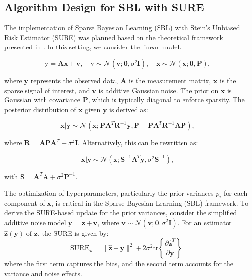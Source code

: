 \documentclass{article}
\begin{document}
\subsection{Algorithm Design for SBL with SURE}
The implementation of Sparse Bayesian Learning (SBL) with Stein's Unbiased Risk Estimator (SURE) was planned based on the theoretical framework presented in \citet{slockSURE}. In this setting, we consider the linear model:

\begin{equation}
    \mathbf{y} = \mathbf{A}\mathbf{x} + \mathbf{v}, \quad \mathbf{v} \sim \mathcal{N}(\mathbf{v}; \mathbf{0}, \sigma^2 \mathbf{I}), \quad \mathbf{x} \sim \mathcal{N}(\mathbf{x}; \mathbf{0}, \mathbf{P}),
\end{equation}

where $\mathbf{y}$ represents the observed data, $\mathbf{A}$ is the measurement matrix, $\mathbf{x}$ is the sparse signal of interest, and $\mathbf{v}$ is additive Gaussian noise. The prior on $\mathbf{x}$ is Gaussian with covariance $\mathbf{P}$, which is typically diagonal to enforce sparsity. The posterior distribution of $\mathbf{x}$ given $\mathbf{y}$ is derived as:

\begin{equation}
    \mathbf{x}|\mathbf{y} \sim \mathcal{N}\left(\mathbf{x}; \mathbf{P}\mathbf{A}^T\mathbf{R}^{-1}\mathbf{y}, \mathbf{P} - \mathbf{P}\mathbf{A}^T\mathbf{R}^{-1}\mathbf{A}\mathbf{P}\right),
\end{equation}

where $\mathbf{R} = \mathbf{A}\mathbf{P}\mathbf{A}^T + \sigma^2 \mathbf{I}$. Alternatively, this can be rewritten as:

\begin{equation}
    \mathbf{x}|\mathbf{y} \sim \mathcal{N}\left(\mathbf{x}; \mathbf{S}^{-1}\mathbf{A}^T\mathbf{y}, \sigma^2 \mathbf{S}^{-1}\right),
\end{equation}

with $\mathbf{S} = \mathbf{A}^T\mathbf{A} + \sigma^2 \mathbf{P}^{-1}$. 

The optimization of hyperparameters, particularly the prior variances \( p_i \) for each component of \(\mathbf{x}\), is critical in the Sparse Bayesian Learning (SBL) framework.  To derive the SURE-based update for the prior variances, consider the simplified additive noise model \(\mathbf{y} = \mathbf{z} + \mathbf{v}\), where \(\mathbf{v} \sim \mathcal{N}(\mathbf{v}; \mathbf{0}, \sigma^2 \mathbf{I})\). For an estimator \(\hat{\mathbf{z}}(\mathbf{y})\) of \(\mathbf{z}\), the SURE is given by:
\begin{equation}
    \text{SURE}_{\mathbf{z}} = \|\hat{\mathbf{z}} - \mathbf{y}\|^2 + 2\sigma^2 \text{tr}\left\{\frac{\partial\hat{\mathbf{z}}^T}{\partial \mathbf{y}}\right\},
\end{equation}
where the first term captures the bias, and the second term accounts for the variance and noise effects. 
\end{document}
